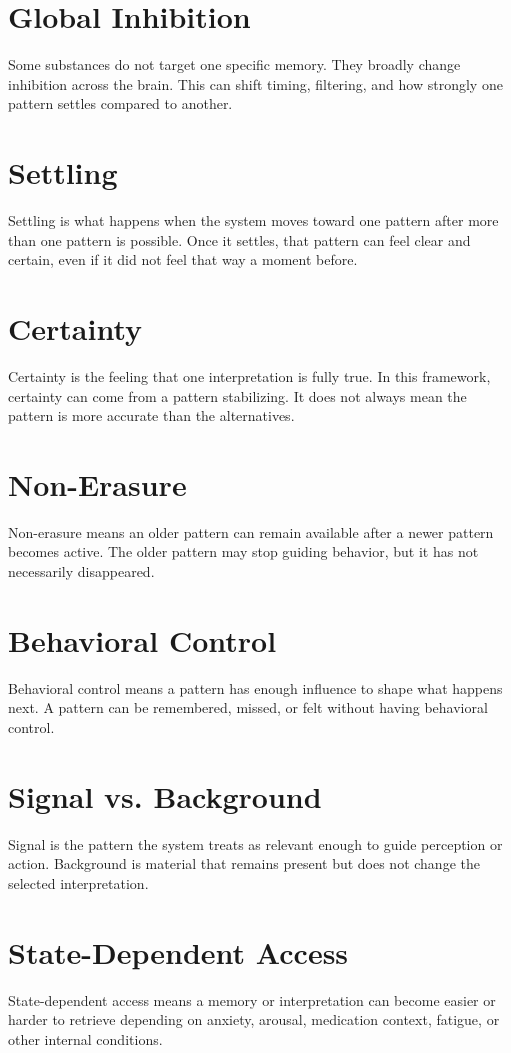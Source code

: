 \documentclass[10pt,twocolumn]{article}
\begin{document}
\section{Global Inhibition}
Some substances do not target one specific memory. They broadly change inhibition across the brain. This can shift timing, filtering, and how strongly one pattern settles compared to another.

\section{Settling}
Settling is what happens when the system moves toward one pattern after more than one pattern is possible. Once it settles, that pattern can feel clear and certain, even if it did not feel that way a moment before.

\section{Certainty}
Certainty is the feeling that one interpretation is fully true. In this framework, certainty can come from a pattern stabilizing. It does not always mean the pattern is more accurate than the alternatives.

\section{Non-Erasure}
Non-erasure means an older pattern can remain available after a newer pattern becomes active. The older pattern may stop guiding behavior, but it has not necessarily disappeared.

\section{Behavioral Control}
Behavioral control means a pattern has enough influence to shape what happens next. A pattern can be remembered, missed, or felt without having behavioral control.

\section{Signal vs. Background}
Signal is the pattern the system treats as relevant enough to guide perception or action. Background is material that remains present but does not change the selected interpretation.

\section{State-Dependent Access}
State-dependent access means a memory or interpretation can become easier or harder to retrieve depending on anxiety, arousal, medication context, fatigue, or other internal conditions.
\end{document}

